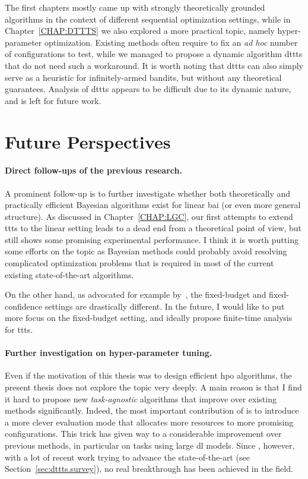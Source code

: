 The first chapters mostly came up with strongly theoretically grounded algorithms in the context of different sequential optimization settings, while in Chapter~\ref{CHAP:DTTTS} we also explored a more practical topic, namely hyper-parameter optimization. Existing methods often require to fix an \emph{ad hoc} number of configurations to test, while we managed to propose a dynamic algorithm \gls{dttts} that do not need such a workaround. It is worth noting that \gls{dttts} can also simply serve as a heuristic for \gls{infinitely-armed bandits}, but without any theoretical guarantees. Analysis of \gls{dttts} appears to be difficult due to its dynamic nature, and is left for future work.

\section{Future Perspectives}

\paragraph{Direct follow-ups of the previous research.} 
A prominent follow-up is to further investigate whether both theoretically and practically efficient Bayesian algorithms exist for linear \gls{bai} (or even more general structure). As discussed in Chapter~\ref{CHAP:LGC}, our first attempts to extend \gls{ttts} to the linear setting leads to a dead end from a theoretical point of view, but still shows some promising experimental performance. I think it is worth putting some efforts on the topic as Bayesian methods could probably avoid resolving complicated optimization problems that is required in most of the current existing state-of-the-art algorithms.

On the other hand, as advocated for example by~\cite{locatelli2016thresholding}, the fixed-budget and fixed-confidence settings are drastically different. In the future, I would like to put more focus on the fixed-budget setting, and ideally propose finite-time analysis for \gls{ttts}.

\paragraph{Further investigation on hyper-parameter tuning.}
Even if the motivation of this thesis was to design efficient \gls{hpo} algorithms, the present thesis does not explore the topic very deeply. A main reason is that I find it hard to propose new \emph{task-agnostic} algorithms that improve over existing methods significantly. Indeed, the most important contribution of \Hyperband{} is to introduce a more clever evaluation mode that allocates more resources to more promising configurations. This trick has given way to a considerable improvement over previous methods, in particular on tasks using large \gls{dl} models. Since \Hyperband{}, however, with a lot of recent work trying to advance the state-of-the-art (see Section~\ref{sec:dttts.survey}), no real breakthrough has been achieved in the field.

